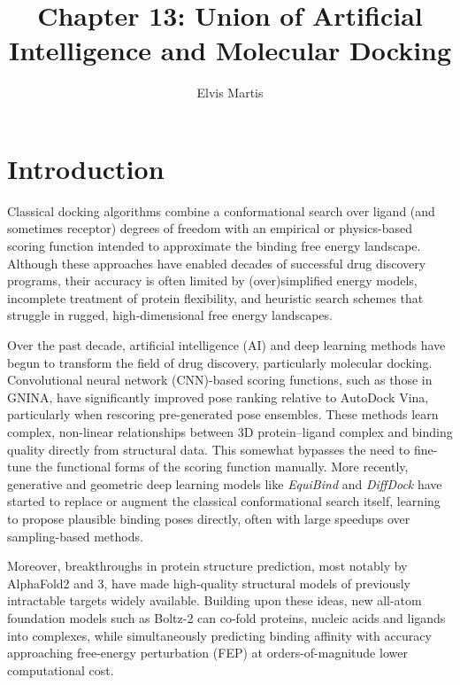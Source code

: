 \documentclass[12pt]{article}
\begin{document}
\title{Chapter 13: Union of Artificial Intelligence and Molecular Docking}
\author{Elvis Martis}
\date{}
\maketitle


\section{Introduction}

Classical docking algorithms combine a conformational search over ligand (and sometimes receptor) degrees of freedom with an empirical or physics-based scoring function intended to approximate the binding free energy landscape. Although these approaches have enabled decades of successful drug discovery programs, their accuracy is often limited by (over)simplified energy models, incomplete treatment of protein flexibility, and heuristic search schemes that struggle in rugged, high-dimensional free energy landscapes. 

Over the past decade, artificial intelligence (AI) and deep learning methods have begun to transform the field of drug discovery, particularly molecular docking. Convolutional neural network (CNN)-based scoring functions, such as those in GNINA\cite{CH13_mcnutt2021gnina}, have significantly improved pose ranking relative to AutoDock Vina, particularly when rescoring pre-generated pose ensembles. These methods learn complex, non-linear relationships between 3D protein–ligand complex and binding quality directly from structural data. This somewhat bypasses the need to fine-tune the functional forms of the scoring function manually\cite{CH13_meli2022dlreview}. More recently, generative and geometric deep learning models like \emph{EquiBind}\cite{CH13_stark2022equibind} and \emph{DiffDock}\cite{CH13_corso2022diffdock} have started to replace or augment the classical conformational search itself, learning to propose plausible binding poses directly, often with large speedups over sampling-based methods. 

Moreover, breakthroughs in protein structure prediction, most notably by AlphaFold2\cite{CH13_jumper2021alphafold} and 3\cite{CH13_abramson2024accurate}, have made high-quality structural models of previously intractable targets widely available. Building upon these ideas, new all-atom foundation models such as Boltz-2\cite{CH13_passaro2025boltz2} can co-fold proteins, nucleic acids and ligands into complexes, while simultaneously predicting binding affinity with accuracy approaching free-energy perturbation (FEP) at orders-of-magnitude lower computational cost.
\end{document}

